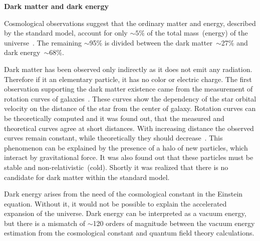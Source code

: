 
\textbf{Dark matter and dark energy}

Cosmological observations suggest that the ordinary matter and energy, described by the standard model, account for only $\sim 5\%$ of the total mass~(energy) of the universe~\cite{Bertone:2004pz, Gaitskell:2004gd, Bennett:2012zja}. The remaining $\sim$95\% is divided between the dark matter~$\sim$27\% and dark energy~$\sim$68\%.

Dark matter has been observed only indirectly as it does not emit any radiation. Therefore if it an elementary particle, it has no color or electric charge. The first observation supporting the dark matter existence came from the measurement of rotation curves of galaxies~\cite{Zwicky:1937zza, Rubin:1980zd}. These curves show the dependency of the star orbital velocity on the distance of the star from the center of galaxy. Rotation curves can be theoretically computed and it was found out, that the measured and theoretical curves agree at short distances. With increasing distance the observed curves remain constant, while theoretically they should decrease~\cite{Bertone:2004pz}. This phenomenon can be explained by the presence of a halo of new particles, which interact by gravitational force. It was also found out that these particles must be stable and non-relativistic~(cold). Shortly it was realized that there is no candidate for dark matter within the standard model.

Dark energy arises from the need of the cosmological constant in the Einstein equation. Without it, it would not be possible to explain the accelerated expansion of the universe. Dark energy can be interpreted as a vacuum energy, but there is a mismatch of $\sim$120 orders of magnitude between the vacuum energy estimation from the cosmological constant and quantum field theory calculations.


